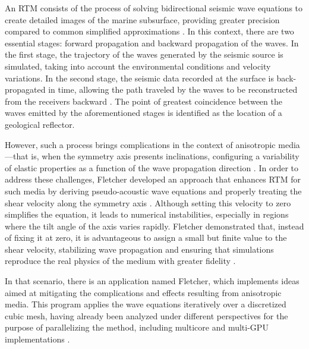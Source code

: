 \documentclass[cic,tc,english]{infufrgs}
\begin{document}
An RTM consists of the process of solving bidirectional seismic
wave equations to create detailed images of the marine subsurface,
providing greater precision compared to common simplified
approximations \cite{seismiccity_rtm}. In this context, there are two
essential stages:
forward propagation and backward propagation of the waves. In the
first stage, the trajectory of the waves generated by the seismic
source is simulated, taking into account the environmental conditions
and velocity variations. In the second stage, the seismic data recorded
at the surface is back-propagated in time, allowing the path
traveled by the waves to be reconstructed from the receivers
backward \cite{rtm}. The point of greatest coincidence between the waves
emitted by the aforementioned stages is identified as the location
of a geological reflector.

However, such a process brings complications in the context of
anisotropic media—that is, when the symmetry axis presents
inclinations, configuring a variability of elastic properties as a
function of the wave propagation direction \cite{anisotropy}. In
order to address these
challenges,
Fletcher developed an approach that enhances RTM for such media by
deriving pseudo-acoustic wave equations and properly treating the
shear velocity along the symmetry axis \cite{fletcher}. Although setting this
velocity to zero simplifies the equation, it leads to numerical
instabilities, especially in regions where the tilt angle of the
axis varies rapidly. Fletcher demonstrated that, instead of fixing
it at zero, it is advantageous to assign a small but finite value
to the shear velocity, stabilizing wave propagation and ensuring
that simulations reproduce the real physics of the medium with
greater fidelity \cite{fletcher_modeling}.

In that scenario, there is an application named
Fletcher, which
implements ideas aimed at mitigating the complications and effects
resulting from anisotropic media. This program applies the wave
equations iteratively over a discretized cubic mesh, having already
been analyzed under different perspectives for the purpose of
parallelizing the method, including multicore and multi-GPU
implementations \cite{multi-gpu}.
\end{document}
